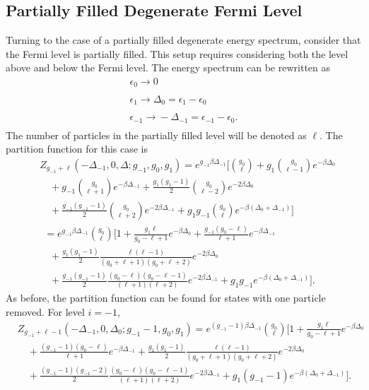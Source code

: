 \subsection{Partially Filled Degenerate Fermi Level}
Turning to the case of a partially filled degenerate energy spectrum, consider that the Fermi level is partially filled. This setup requires considering both the level above and below the Fermi level. The energy spectrum can be rewritten as 
\begin{gather}
    \epsilon_0 \xrightarrow[]{} 0\nonumber\\
    \epsilon_1 \xrightarrow[]{} \Delta_0=\epsilon_1-\epsilon_0\nonumber\\
    \epsilon_{-1} \xrightarrow[]{} -\Delta_{-1}=\epsilon_{-1}-\epsilon_0.\nonumber
\end{gather}
The number of particles in the partially filled level will be denoted as $\ell$. The partition function for this case is 
\begin{align}
    &Z_{g_{-1}+\ell}(-\Delta_{-1},0,\Delta;g_{-1},g_0,g_1) = e^{g_{-1}\beta\Delta_{-1}} \Biggr[{g_0\choose \ell}+g_1{g_0\choose \ell-1}e^{-\beta\Delta_0} \nonumber\\
    &\quad +g_{-1}{g_0\choose \ell+1}e^{-\beta\Delta_{-1}} +\frac{g_1(g_1-1)}{2} {g_0\choose \ell-2}e^{-2\beta\Delta_0}\nonumber\\ 
    &\quad +\frac{g_{-1}(g_{-1}-1)}{2} {g_0\choose \ell+2} e^{-2\beta\Delta_{-1}} +g_1g_{-1}{g_0\choose \ell} e^{-\beta(\Delta_0+\Delta_{-1})} \Biggr]\nonumber\\
    &\ \ =e^{g_{-1}\beta\Delta_{-1}} {g_0\choose \ell} \Biggr[1+ \frac{g_1 \ell}{g_0-\ell+1} e^{-\beta\Delta_0} +\frac{g_{-1}(g_0-\ell)}{\ell+1} e^{-\beta\Delta_{-1}} \nonumber\\
    &\quad+\frac{g_1(g_1-1)}{2} \frac{\ell(\ell-1)}{(g_0+\ell+1)(g_0+\ell+2)}e^{-2\beta\Delta_0} \nonumber\\
    &\quad+\frac{g_{-1}(g_{-1}-1)}{2} \frac{(g_0-\ell)(g_0-\ell-1)}{(\ell+1)(\ell+2)} e^{-2\beta\Delta_{-1}}+g_1g_{-1}e^{-\beta(\Delta_0+\Delta_{-1})}\Biggr].
\end{align}
As before, the partition function can be found for states with one particle removed. For level $i=-1$,
\begin{align}
    &Z_{g_{-1}+\ell-1}(-\Delta_{-1},0,\Delta_0;g_{-1}-1,g_0,g_1)=e^{(g_{-1}-1)\beta\Delta_{-1}} {g_0\choose \ell} \Biggr[1+\frac{g_1 \ell}{g_0-\ell+1} e^{-\beta\Delta_0} \nonumber\\
    &\quad +\frac{(g_{-1}-1)(g_0-\ell)}{\ell+1} e^{-\beta\Delta_{-1}}+\frac{g_1(g_1-1)}{2} \frac{\ell(\ell-1)}{(g_0+\ell+1)(g_0+\ell+2)}e^{-2\beta\Delta_0} \nonumber\\
    &\quad+\frac{(g_{-1}-1)(g_{-1}-2)}{2} \frac{(g_0-\ell)(g_0-\ell-1)}{(\ell+1)(\ell+2)} e^{-2\beta\Delta_{-1}}+g_1(g_{-1}-1)e^{-\beta(\Delta_0+\Delta_{-1})}\Biggr].
\end{align}
